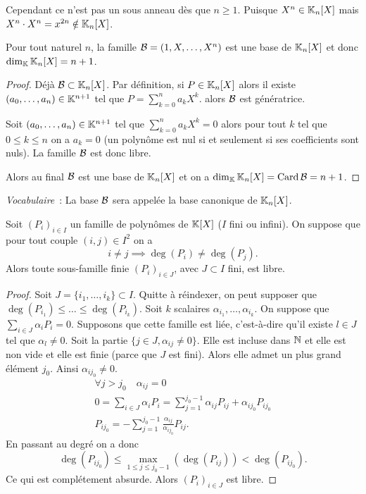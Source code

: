 Cependant ce n'est pas un sous anneau dès que \(n \geqslant 1\). Puisque \(X^n
\in \mathbb{K}_n[X]\) mais \(X^n \cdot X^n = x^{2n} \notin \mathbb{K}_n[X]\).

\begin{prop}
  Pour tout naturel \(n\), la famille \(\mathcal{B} = (1,X, \ldots, X^n)\) est une base de
  \(\mathbb{K}_n[X]\) et donc \(\dim_{\mathbb{K}} \mathbb{K}_n[X] = n+1\).
\end{prop}
\begin{proof}
  Déjà \(\mathcal{B} \subset \mathbb{K}_n[X]\). Par définition, si \(P \in \mathbb{K}_n[X]\) alors il
  existe \((a_0,\ldots, a_n) \in \mathbb{K}^{n+1}\) tel que \(P = \sum_{k = 0}^n a_k X^k\).
  alors \(\mathcal{B}\) est génératrice.

  Soit \((a_0,\ldots, a_n) \in \mathbb{K}^{n+1}\) tel que \(\sum_{k = 0}^n a_k X^k =0\)
  alors pour tout \(k\) tel que \(0\leqslant k \leqslant n\) on a \(a_k = 0\) (un
  polynôme est nul si et seulement si ses coefficients sont nuls). La famille
  \(\mathcal{B}\) est donc libre.

  Alors au final \(\mathcal{B}\) est une base de \(\mathbb{K}_n[X]\) et on a \(\dim_{\mathbb{K}}
  \mathbb{K}_n[X] = \operatorname{Card} \mathcal{B} = n+1\).
\end{proof}

\emph{Vocabulaire}~: La base \(\mathcal{B}\) sera appelée la base canonique de
\(\mathbb{K}_n[X]\).

\begin{prop}
  Soit \((P_i)_{i \in I}\) un famille de polynômes de \(\mathbb{K}[X]\) (\(I\) fini ou
  infini). On suppose que pour tout couple \((i,j) \in I^2\) on a
  \begin{equation}
    i \neq j \implies \deg(P_i) \neq \deg(P_j).
  \end{equation}
  Alors toute sous-famille finie \((P_i)_{i \in J}\), avec \(J \subset I\) fini,
  est libre.
\end{prop}
\begin{proof}
  Soit \(J = \{i_1, \ldots, i_k\} \subset I\). Quitte à réindexer, on peut
  supposer que \(\deg(P_{i_1}) \leqslant \ldots \leqslant \deg(P_{i_k})\). Soit
  \(k\) scalaires \(\alpha_{i_1}, \ldots, \alpha_{i_k}\). On suppose que
  \(\sum_{i \in J} \alpha_i P_i = 0\). Supposons que cette famille est liée,
  c'est-à-dire qu'il existe \(l \in J\) tel que \(\alpha_l \neq 0\). Soit la
  partie \(\{j \in J, \alpha_{ij} \neq 0\}\). Elle est incluse dans \(\mathbb{N}\) et
  elle est non vide et elle est finie (parce que \(J\) est fini). Alors elle
  admet un plus grand élément \(j_0\). Ainsi \(\alpha_{ij_0} \neq 0\).
  \begin{gather}
    \forall j > j_0 \quad \alpha_{ij} = 0 \\
    0 = \sum_{i \in J} \alpha_i P_i = \sum_{j = 1}^{j_0-1} \alpha_{ij} P_{ij} +
    \alpha_{ij_0} P_{ij_0}\\
    P_{ij_0} = - \sum_{j = 1}^{j_0-1} \frac{\alpha_{ij}}{\alpha_{ij_0}} P_{ij}.
  \end{gather}
  En passant au degré on a donc
  \begin{equation}
    \deg(P_{ij_0}) \leqslant \max\limits_{1 \leqslant j \leqslant
    j_0-1}(\deg(P_{ij})) < \deg(P_{ij_0}).
  \end{equation}
  Ce qui est complétement absurde. Alors \((P_i)_{i \in J}\) est libre.
\end{proof}

